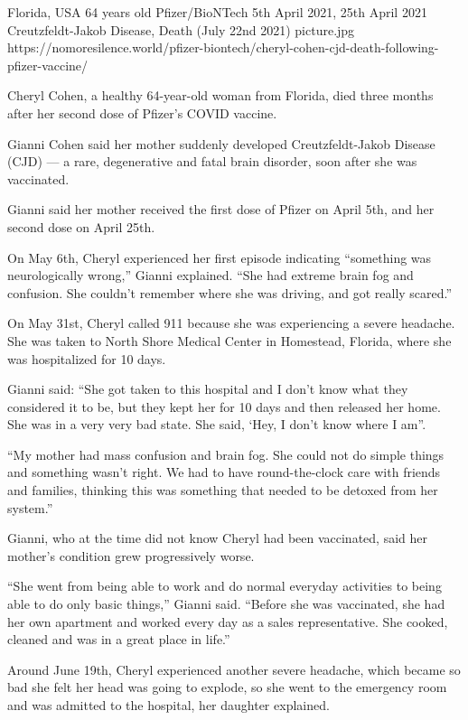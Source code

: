 {Florida, USA}
{64 years old}
{Pfizer/BioNTech}
{5th April 2021, 25th April 2021}
{Creutzfeldt-Jakob Disease, Death (July 22nd 2021)}
{picture.jpg}
{https://nomoresilence.world/pfizer-biontech/cheryl-cohen-cjd-death-following-pfizer-vaccine/}
{

\normalsize

Cheryl Cohen, a healthy 64-year-old woman from Florida, died three months after
her second dose of Pfizer’s COVID vaccine.

Gianni Cohen said her mother suddenly developed Creutzfeldt-Jakob Disease (CJD)
— a rare, degenerative and fatal brain disorder, soon after she was vaccinated.

Gianni said her mother received the first dose of Pfizer on April 5th, and her
second dose on April 25th.

On May 6th, Cheryl experienced her first episode indicating “something was
neurologically wrong,” Gianni explained. “She had extreme brain fog and
confusion. She couldn’t remember where she was driving, and got really scared.”

On May 31st, Cheryl called 911 because she was experiencing a severe
headache. She was taken to North Shore Medical Center in Homestead, Florida,
where she was hospitalized for 10 days.

Gianni said: “She got taken to this hospital and I don’t know what they
considered it to be, but they kept her for 10 days and then released her
home. She was in a very very bad state. She said, ‘Hey, I don’t know where I
am”.

“My mother had mass confusion and brain fog. She could not do simple things and
something wasn’t right. We had to have round-the-clock care with friends and
families, thinking this was something that needed to be detoxed from her
system.”

Gianni, who at the time did not know Cheryl had been vaccinated, said her
mother’s condition grew progressively worse.

“She went from being able to work and do normal everyday activities to being
able to do only basic things,” Gianni said. “Before she was vaccinated, she had
her own apartment and worked every day as a sales representative. She cooked,
cleaned and was in a great place in life.”

Around June 19th, Cheryl experienced another severe headache, which became so
bad she felt her head was going to explode, so she went to the emergency room
and was admitted to the hospital, her daughter explained.

}
